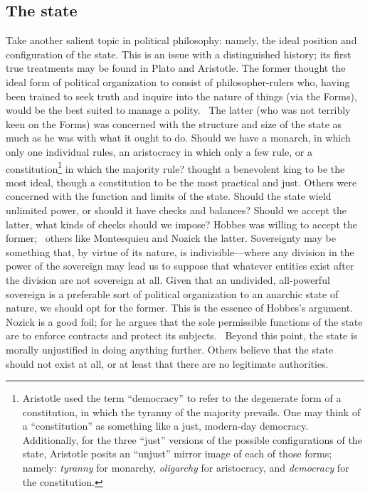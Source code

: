 \subsection{The state}
Take another salient topic in political philosophy: namely, the ideal position and configuration of the state. This is an issue with a distinguished history; its first true treatments may be found in Plato and Aristotle. The former thought the ideal form of political organization to consist of philosopher-rulers who, having been trained to seek truth and inquire into the nature of things (via the Forms), would be the best suited to manage a polity.~\citep{Plato(1968)} The latter (who was not terribly keen on the Forms) was concerned with the structure and size of the state as much as he was with what it ought to do. Should we have a monarch, in which only one individual rules, an aristocracy in which only a few rule, or a constitution\footnote{Aristotle used the term “democracy” to refer to the degenerate form of a constitution, in which the tyranny of the majority prevails. One may think of a “constitution” as something like a just, modern-day democracy. Additionally, for the three “just” versions of the possible configurations of the state, Aristotle posits an “unjust” mirror image of each of those forms; namely: \emph{tyranny} for monarchy, \emph{oligarchy} for aristocracy, and \emph{democracy} for the constitution.} in which the majority rule? \citet{Aristotle(2008)} thought a benevolent king to be the most ideal, though a constitution to be the most practical and just. Others were concerned with the function and limits of the state. Should the state wield unlimited power, or should it have checks and balances? Should we accept the latter, what kinds of checks should we impose? Hobbes was willing to accept the former;~\citep{Hobbes(1994)} others like Montesquieu and Nozick the latter. Sovereignty may be something that, by virtue of its nature, is indivisible---where any division in the power of the sovereign may lead us to suppose that whatever entities exist after the division are not sovereign at all. Given that an undivided, all-powerful sovereign is a preferable sort of political organization to an anarchic state of nature, we should opt for the former. This is the essence of Hobbes’s argument. Nozick is a good foil; for he argues that the sole permissible functions of the state are to enforce contracts and protect its subjects.~\citep{Nozick(1974)} Beyond this point, the state is morally unjustified in doing anything further. Others believe that the state should not exist at all, or at least that there are no legitimate authorities.

